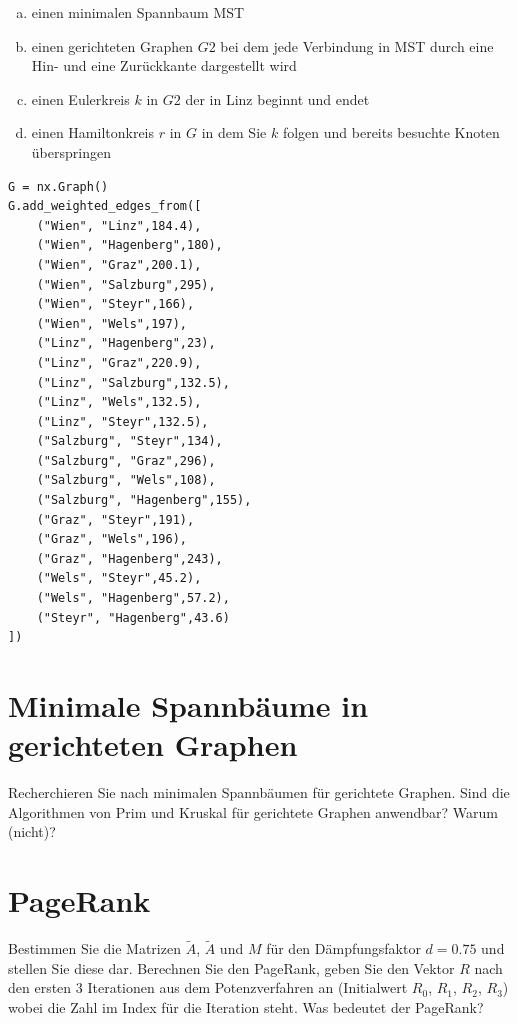 \documentclass[a4paper,11pt]{report}
\begin{document}
    \begin{enumerate}[a)]
        \item einen minimalen Spannbaum MST
        \item einen gerichteten Graphen $G2$ bei dem jede Verbindung in MST durch eine Hin- und
        eine Zurückkante dargestellt wird
        \item einen Eulerkreis $k$ in $G2$ der in Linz beginnt und endet
        \item einen Hamiltonkreis $r$ in $G$ in dem Sie $k$ folgen und bereits besuchte Knoten
        überspringen
    \end{enumerate}

    \begin{verbatim}
G = nx.Graph()
G.add_weighted_edges_from([
    ("Wien", "Linz",184.4),
    ("Wien", "Hagenberg",180),
    ("Wien", "Graz",200.1),
    ("Wien", "Salzburg",295),
    ("Wien", "Steyr",166),
    ("Wien", "Wels",197),
    ("Linz", "Hagenberg",23),
    ("Linz", "Graz",220.9),
    ("Linz", "Salzburg",132.5),
    ("Linz", "Wels",132.5),
    ("Linz", "Steyr",132.5),
    ("Salzburg", "Steyr",134),
    ("Salzburg", "Graz",296),
    ("Salzburg", "Wels",108),
    ("Salzburg", "Hagenberg",155),
    ("Graz", "Steyr",191),
    ("Graz", "Wels",196),
    ("Graz", "Hagenberg",243),
    ("Wels", "Steyr",45.2),
    ("Wels", "Hagenberg",57.2),
    ("Steyr", "Hagenberg",43.6)
])
    \end{verbatim}

    \newpage

    \chapter{Minimale Spannbäume in gerichteten Graphen}
    \label{ch:minSbDiGraph}
    Recherchieren Sie nach minimalen Spannbäumen für gerichtete Graphen.
    Sind die Algorithmen von Prim und Kruskal für gerichtete Graphen anwendbar?
    Warum (nicht)?

    \newpage

    \chapter{PageRank}
    \label{ch:pageRank}
    Bestimmen Sie die Matrizen $\widetilde{A}$, $\widetilde{A}$ und $M$ für den Dämpfungsfaktor $d = 0.75$ und stellen Sie diese dar.
    Berechnen Sie den PageRank, geben Sie den Vektor $R$ nach den ersten $3$ Iterationen aus dem Potenzverfahren an (Initialwert $R_0$, $R_1$, $R_2$, $R_3$) wobei die Zahl im Index für die Iteration steht.
    Was bedeutet der PageRank?
\end{document}
